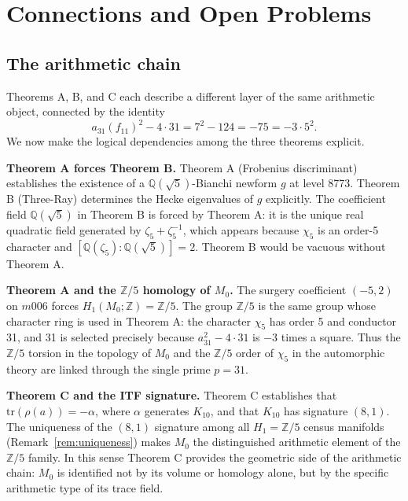 
\section{Connections and Open Problems}
\label{sec:connections}

\subsection{The arithmetic chain}

Theorems A, B, and C each describe a different layer of the same
arithmetic object, connected by the identity
\begin{equation}
\label{eq:master-identity}
  a_{31}(f_{11})^2 - 4\cdot 31 = 7^2 - 124 = -75 = -3\cdot 5^2.
\end{equation}
We now make the logical dependencies among the three theorems explicit.

\medskip
\textbf{Theorem A forces Theorem B.}
Theorem A (Frobenius discriminant) establishes the existence of a
$\mathbb{Q}(\sqrt{5})$-Bianchi newform $g$ at level 8773. Theorem B
(Three-Ray) determines the Hecke eigenvalues of $g$ explicitly. The
coefficient field $\mathbb{Q}(\sqrt{5})$ in Theorem B is forced by
Theorem A: it is the unique real quadratic field generated by
$\zeta_5 + \zeta_5^{-1}$, which appears because $\chi_5$ is an order-5
character and $[\mathbb{Q}(\zeta_5):\mathbb{Q}(\sqrt{5})] = 2$.
Theorem B would be vacuous without Theorem A.

\medskip
\textbf{Theorem A and the $\mathbb{Z}/5$ homology of $M_0$.}
The surgery coefficient $(-5,2)$ on $m006$ forces $H_1(M_0;\mathbb{Z}) = \mathbb{Z}/5$.
The group $\mathbb{Z}/5$ is the same group whose character ring is used in
Theorem A: the character $\chi_5$ has order 5 and conductor 31, and 31 is
selected precisely because $a_{31}^2 - 4\cdot 31$ is $-3$ times a square.
Thus the $\mathbb{Z}/5$ torsion in the topology of $M_0$ and the $\mathbb{Z}/5$
order of $\chi_5$ in the automorphic theory are linked through the single
prime $p = 31$.

\medskip
\textbf{Theorem C and the ITF signature.}
Theorem C establishes that $\mathrm{tr}(\rho(a)) = -\alpha$, where $\alpha$
generates $K_{10}$, and that $K_{10}$ has signature $(8,1)$. The uniqueness
of the $(8,1)$ signature among all $H_1 = \mathbb{Z}/5$ census manifolds
(Remark~\ref{rem:uniqueness}) makes $M_0$ the distinguished arithmetic
element of the $\mathbb{Z}/5$ family. In this sense Theorem C provides the
geometric side of the arithmetic chain: $M_0$ is identified not by its
volume or homology alone, but by the specific arithmetic type of its trace
field.

